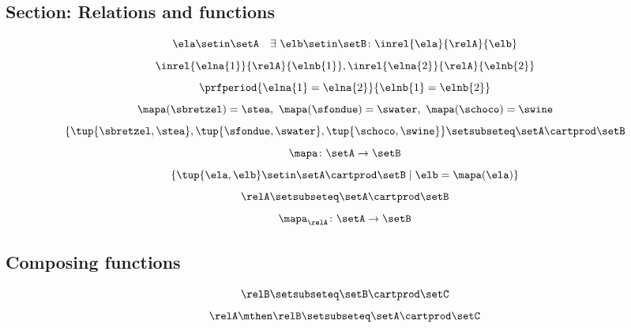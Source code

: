 \begin{forslides}
\subsection{Section: Relations and functions}  

 \begin{equation}\label{eq:slides_session2_rel_99}
\ela \setin \setA \quad \exists \ \elb \setin \setB\colon  \inrel{\ela}{\relA}{\elb}
\end{equation}
\begin{equation}\label{eq:slides_session2_rel_100}
\inrel{\elna{1}}{\relA}{\elnb{1}}, \inrel{\elna{2}}{\relA}{\elnb{2}}
\end{equation}
 \begin{equation}\label{eq:slides_session2_rel_101}
\prfperiod{\elna{1} = \elna{2}}{\elnb{1} = \elnb{2}}
\end{equation}
\begin{equation}\label{eq:slides_session2_rel_102}
\mapa (\sbretzel) = \stea, \ \mapa (\sfondue) = \swater, \ \mapa(\schoco) = \swine
\end{equation}
 \begin{equation}\label{eq:slides_session2_rel_103}
\{ \tup{\sbretzel, \stea}, \tup{\sfondue, \swater}, \tup{\schoco, \swine} \} \setsubseteq \setA \cartprod \setB
\end{equation}
\begin{equation}\label{eq:slides_session2_rel_104}
\mapa \colon \setA \to \setB
\end{equation}
 \begin{equation}\label{eq:slides_session2_rel_105}
 \{ \tup{\ela,\elb} \setin \setA \cartprod \setB \mid \elb= \mapa(\ela) \}
\end{equation}
\begin{equation}\label{eq:slides_session2_rel_106}
\relA \setsubseteq \setA \cartprod \setB
\end{equation}
 \begin{equation}\label{eq:slides_session2_rel_107}
\mapa_\relA \colon \setA \to \setB
\end{equation}

\subsection{Composing functions}

\begin{equation}\label{eq:slides_session2_rel_108}
\relB \setsubseteq \setB \cartprod \setC
\end{equation}
 \begin{equation}\label{eq:slides_session2_rel_109}
\relA \mthen \relB \setsubseteq \setA \cartprod \setC
\end{equation}


\end{forslides}
